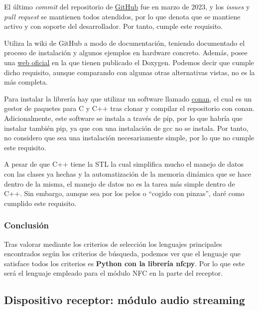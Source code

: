 \begin{todolist}
    \item [\xcmark] El último \emph{commit} del repositorio de
    \href{https://github.com/liblogicalaccess/liblogicalaccess}{GitHub} fue en
    marzo de 2023, y los \emph{issues} y \emph{pull request} se mantienen todos
    atendidos, por lo que denota que se mantiene activo y con soporte del
    desarrollador. Por tanto, cumple este requisito.
    \item [\xcmark] Utiliza la wiki de GitHub a modo de documentación, teniendo
    documentado el proceso de instalación y algunos ejemplos en hardware
    concreto. Además, posee una \href{https://liblogicalaccess.com/}{web oficial}
    en la que tienen publicado el Doxygen. Podemos decir que cumple dicho requisito,
    aunque comparando con algunas otras alternativas vistas, no es la más
    completa.
    \item Para instalar la librería hay que utilizar un software llamado
    \href{https://conan.io/}{conan}, el cual es un gestor de paquetes para C y
    C++ tras clonar y compilar el repositorio con conan. Adicionalmente, este
    software se instala a través de pip, por lo que habría que instalar también
    pip, ya que con una instalación de gcc no se instala. Por tanto, no considero
    que sea una instalación necesariamente simple, por lo que no cumple este
    requisito.
    \item [\xcmark] A pesar de que C++ tiene la STL la cual simplifica mucho el manejo de
    datos con las clases ya hechas y la automatización de la memoria dinámica
    que se hace dentro de la misma, el manejo de datos no es la tarea más simple
    dentro de C++. Sin embargo, aunque sea por los pelos o ``cogido con pinzas'',
    daré como cumplido este requisito.
\end{todolist}

\subsubsection{Conclusión}

Tras valorar mediante los criterios de selección los lenguajes principales
encontrados según los criterios de búsqueda, podemos ver que el lenguaje que
satisface todos los criterios es \textbf{Python con la librería nfcpy}. Por lo que este
será el lenguaje empleado para el módulo NFC en la parte del receptor.

\subsection{Dispositivo receptor: módulo audio streaming}

